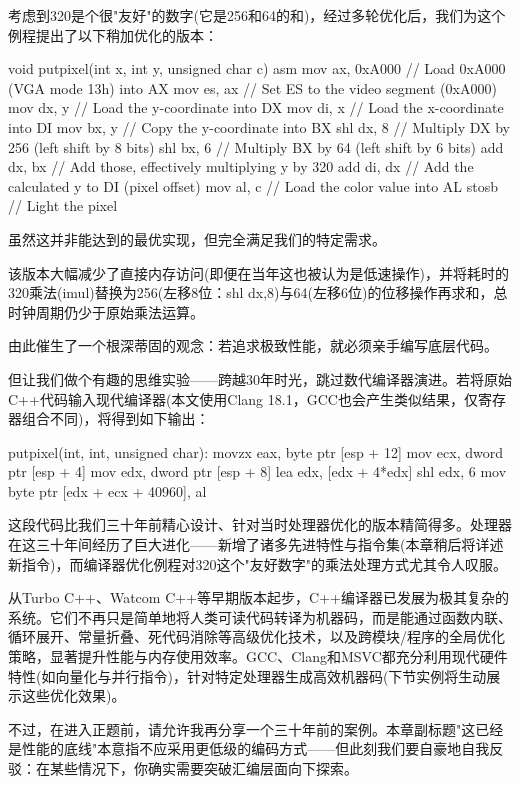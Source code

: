 考虑到320是个很"友好"的数字(它是256和64的和)，经过多轮优化后，我们为这个例程提出了以下稍加优化的版本：

\begin{cpp}
void putpixel(int x, int y, unsigned char c) {
asm {
    mov ax, 0xA000 // Load 0xA000 (VGA mode 13h) into AX
    mov es, ax // Set ES to the video segment (0xA000)
    mov dx, y // Load the y-coordinate into DX
    mov di, x // Load the x-coordinate into DI
    mov bx, y // Copy the y-coordinate into BX
    shl dx, 8 // Multiply DX by 256 (left shift by 8 bits)
    shl bx, 6 // Multiply BX by 64 (left shift by 6 bits)
    add dx, bx // Add those, effectively multiplying y by 320
    add di, dx // Add the calculated y to DI (pixel offset)
    mov al, c // Load the color value into AL
    stosb // Light the pixel
  } 
}
\end{cpp}

虽然这并非能达到的最优实现，但完全满足我们的特定需求。

该版本大幅减少了直接内存访问(即便在当年这也被认为是低速操作)，并将耗时的320乘法(imul)替换为256(左移8位：shl dx,8)与64(左移6位)的位移操作再求和，总时钟周期仍少于原始乘法运算。

由此催生了一个根深蒂固的观念：若追求极致性能，就必须亲手编写底层代码。

但让我们做个有趣的思维实验——跨越30年时光，跳过数代编译器演进。若将原始C++代码输入现代编译器(本文使用Clang 18.1，GCC也会产生类似结果，仅寄存器组合不同)，将得到如下输出：

\begin{shell}
putpixel(int, int, unsigned char):
  movzx eax, byte ptr [esp + 12]
  mov ecx, dword ptr [esp + 4]
  mov edx, dword ptr [esp + 8]
  lea edx, [edx + 4*edx]
  shl edx, 6
  mov byte ptr [edx + ecx + 40960], al
\end{shell}

这段代码比我们三十年前精心设计、针对当时处理器优化的版本精简得多。处理器在这三十年间经历了巨大进化——新增了诸多先进特性与指令集(本章稍后将详述新指令)，而编译器优化例程对320这个"友好数字"的乘法处理方式尤其令人叹服。

从Turbo C++、Watcom C++等早期版本起步，C++编译器已发展为极其复杂的系统。它们不再只是简单地将人类可读代码转译为机器码，而是能通过函数内联、循环展开、常量折叠、死代码消除等高级优化技术，以及跨模块/程序的全局优化策略，显著提升性能与内存使用效率。GCC、Clang和MSVC都充分利用现代硬件特性(如向量化与并行指令)，针对特定处理器生成高效机器码(下节实例将生动展示这些优化效果)。

不过，在进入正题前，请允许我再分享一个三十年前的案例。本章副标题"这已经是性能的底线"本意指不应采用更低级的编码方式——但此刻我们要自豪地自我反驳：在某些情况下，你确实需要突破汇编层面向下探索。

